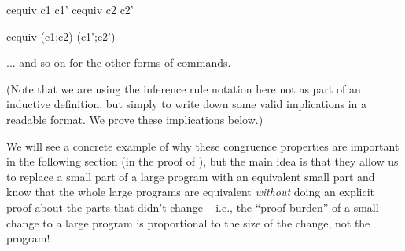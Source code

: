 \documentclass[12pt]{report}
\begin{document}
              cequiv c1 c1'
              cequiv c2 c2'
\par
\noindent\hrulefill\par
\noindent{}
         cequiv (c1;c2) (c1';c2')


    ... and so on for the other forms of commands. 

 (Note that we are using the inference rule notation here not
    as part of an inductive definition, but simply to write down some
    valid implications in a readable format. We prove these
    implications below.) 

 We will see a concrete example of why these congruence
    properties are important in the following section (in the proof of
    ), but the main idea is that they allow
    us to replace a small part of a large program with an equivalent
    small part and know that the whole large programs are equivalent
    \textit{without} doing an explicit proof about the parts that didn't
    change -- i.e., the ``proof burden'' of a small change to a large
    program is proportional to the size of the change, not the
    program! 
\end{document}
